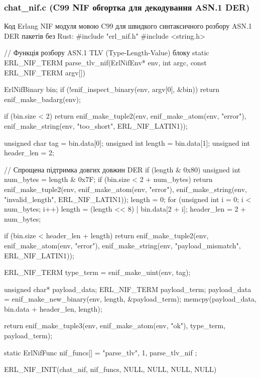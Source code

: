 \documentclass{article}
\let\originalfootnotesize\footnotesize
\let\oldverbatim\verbatim
\let\oldendverbatim\endverbatim
\renewenvironment{verbatim}{\originalfootnotesize\oldverbatim}{\oldendverbatim}
\begin{document}
\subsubsection{chat\_nif.c (C99 NIF обгортка для декодування ASN.1 DER)}
Код Erlang NIF модуля мовою C99 для швидкого синтаксичного розбору ASN.1 DER пакетів без Rust:
\begin{verbatim}
#include "erl_nif.h"
#include <string.h>

// Функція розбору ASN.1 TLV (Type-Length-Value) блоку
static ERL_NIF_TERM parse_tlv_nif(ErlNifEnv* env, int argc, const ERL_NIF_TERM argv[]) {
    ErlNifBinary bin;
    if (!enif_inspect_binary(env, argv[0], &bin)) {
        return enif_make_badarg(env);
    }

    if (bin.size < 2) {
        return enif_make_tuple2(env, enif_make_atom(env, "error"), 
                                enif_make_string(env, "too_short", ERL_NIF_LATIN1));
    }

    unsigned char tag = bin.data[0];
    unsigned int length = bin.data[1];
    unsigned int header_len = 2;

    // Спрощена підтримка довгих довжин DER
    if (length & 0x80) {
        unsigned int num_bytes = length & 0x7F;
        if (bin.size < 2 + num_bytes) {
            return enif_make_tuple2(env, enif_make_atom(env, "error"), 
                                    enif_make_string(env, "invalid_length", ERL_NIF_LATIN1));
        }
        length = 0;
        for (unsigned int i = 0; i < num_bytes; i++) {
            length = (length << 8) | bin.data[2 + i];
        }
        header_len = 2 + num_bytes;
    }

    if (bin.size < header_len + length) {
        return enif_make_tuple2(env, enif_make_atom(env, "error"),
                                enif_make_string(env, "payload_mismatch", ERL_NIF_LATIN1));
    }

    ERL_NIF_TERM type_term = enif_make_uint(env, tag);

    unsigned char* payload_data;
    ERL_NIF_TERM payload_term;
    payload_data = enif_make_new_binary(env, length, &payload_term);
    memcpy(payload_data, bin.data + header_len, length);

    return enif_make_tuple3(env, enif_make_atom(env, "ok"), type_term, payload_term);
}

static ErlNifFunc nif_funcs[] = {
    {"parse_tlv", 1, parse_tlv_nif}
};

ERL_NIF_INIT(chat_nif, nif_funcs, NULL, NULL, NULL, NULL)
\end{verbatim}
\end{document}
